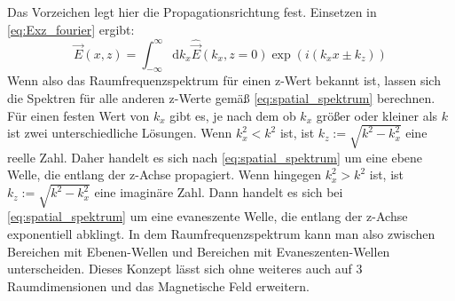 \documentclass{article}
\begin{document}
	Das Vorzeichen legt hier die Propagationsrichtung fest.
	Einsetzen in \eqref{eq:Exz_fourier} ergibt:
		\begin{equation}
			\label{eq:Espatial_spektrum}
			\vec{E}(x,z) = \int_{-\infty}^{\infty}\mathrm{d}{k_x}\hat{\vec{E}}(k_x,z= 0)\exp(i(k_xx\pm k_ z))
		\end{equation}
	Wenn also das Raumfrequenzspektrum für einen z-Wert bekannt ist, lassen sich die Spektren für alle anderen z-Werte gemäß \eqref{eq:spatial_spektrum} berechnen. Für einen festen Wert von $k_x$ gibt es, je nach dem ob $k_x$ größer oder kleiner als $k$ ist zwei unterschiedliche Lösungen. Wenn $k_x^2 < k^2$ ist, ist $k_z := \sqrt{k^2-k_x^2}$ eine reelle Zahl. Daher handelt es sich nach \eqref{eq:spatial_spektrum} um eine ebene Welle, die entlang der z-Achse propagiert.
	Wenn hingegen $k_x^2 > k^2$ ist, ist $k_z := \sqrt{k^2-k_x^2}$ eine imaginäre Zahl. Dann handelt es sich bei \eqref{eq:spatial_spektrum} um eine evaneszente Welle, die entlang der z-Achse exponentiell abklingt. In dem Raumfrequenzspektrum kann man also zwischen Bereichen mit Ebenen-Wellen und  Bereichen mit Evaneszenten-Wellen unterscheiden. Dieses Konzept lässt sich ohne weiteres auch auf 3 Raumdimensionen und das Magnetische Feld erweitern.
\end{document}
